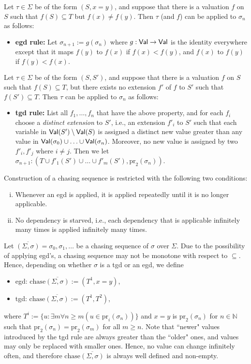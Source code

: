 \documentclass[envcountset]{llncs}
\newcommand{\problemFont}[1]{\protect\ensuremath{\mathsf{#1}}}
\newcommand{\si}{\sigma}
\newcommand{\Si}{\Sigma}
\newcommand{\sub}{\subseteq}
\newcommand{\pr}{\mathrm{pr}}
\newcommand{\N}{\mathbb{N}}
\newcommand{\Val}{\problemFont{Val}}
\newcommand{\chase}[1]{\overline{(#1)}}
\newcommand{\ochase}[1]{\textrm{chase}\overline{(#1)}}
\begin{document}
Let $\tau\in \Si$ be of the form $(S,x=y)$, and  suppose that there is a valuation $f$ on $S$ such that $f(S)\sub T$ but $f(x) \neq f(y)$. Then $\tau$ (and $f$) can be applied to $\si_n$ as follows:
\begin{itemize}
\item \textbf{egd rule:}  Let $\si_{n+1}:= g(\si_n)$ where $g: \Val \to \Val$ is the identity everywhere except that it maps $f(y)$ to $f(x)$ if $f(x) < f(y)$, and $f(x)$ to $f(y)$ if $f(y) < f(x)$.
\end{itemize}
Let $\tau\in \Si$ be of the form $(S, S')$, and suppose that there is a valuation $f$ on $S$ such that $f(S) \sub T$, but there exists no extension $f'$ of $f$ to $S'$ such that $f(S')\sub T$. Then $\tau$  can be applied to $\si_n$ as follows:
\begin{itemize}
\item \textbf{tgd rule:}  List all $f_1, \ldots , f_n$ that have the above property, and for each $f_i$ choose a \emph{distinct extension} to $S'$, i.e., an extension $f'_i$ to $S'$ such that each variable in $\Val(S') \setminus \Val(S)$ is assigned a distinct new value greater than any value in $\Val(\si_0)\cup \ldots\cup\Val(\si_n)$. Moreover, no new value is assigned by two $f'_i,f'_j$ where $i \neq j$. Then we let $\si_{n+1}:( T \cup f'_1(S')\cup  \ldots \cup f'_m(S'),\pr_2(\si_{n}))$.
\end{itemize}

Construction of a chasing sequence is restricted with the following two conditions:
\begin{enumerate}[(i)]
\item Whenever an egd is applied, it is applied repeatedly until it is no longer applicable.
\item No dependency is starved, i.e., each dependency that is applicable infinitely many times is applied infinitely many times.
\end{enumerate}
Let $\chase{\Si,\si}=\si_0, \si_1,\ldots $ be a chasing sequence of $\si$ over $\Si$. Due to the possibility of applying egd's, a chasing sequence may not be monotone with respect to $\sub$. Hence, depending on whether $\si$ is a tgd or an egd, we define
\begin{itemize}
\item egd: $\ochase{\Si,\si}:=(T^1,x=y)$,
\item tgd: $\ochase{\Si,\si}:=(T^1,T^2)$,
\end{itemize}
where $T^i:= \{u:\exists m \forall n\geq m (u\in \pr_i(\si_n))\}$ and $x=y$ is $\pr_2(\si_n)$ for $n\in \N $ such that $\pr_2(\si_n)=\pr_2(\si_m)$ for all $m\geq n$. Note that ``newer" values introduced by the tgd rule are always greater than the ``older" ones, and values may only be replaced  with smaller ones. Hence, no value can change infinitely often, and therefore $\ochase{\Si,\si}$ is always well defined and non-empty.
\end{document}
